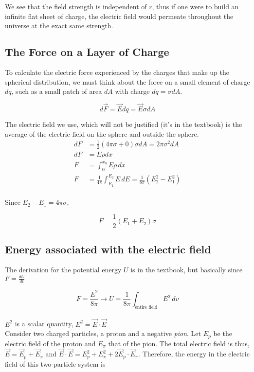 \documentclass[svgnames]{article}
\begin{document}
We see that the field strength is independent of $r$, thus if one were to build an infinite flat sheet of charge, the electric field would permeate throughout the universe at the exact same strength. 

\subsection{The Force on a Layer of Charge}

\vspace{20px}

To calculate the electric force experienced by the charges that make up the spherical distribution, we must think about the force on a small element of charge $dq$, such as a small patch of area $dA$ with charge $dq = \sigma dA$. 

\[ d\vec{F} = \vec{E} dq = \vec{E} \sigma dA \]

The electric field we use, which will not be justified (it's in the textbook) is the average of the electric field on the sphere and outside the sphere. \\ 
\begin{align*} 
 dF &= \frac{1}{2} (4\pi \sigma + 0)\sigma dA = 2\pi \sigma^2 dA\\
 dF &=  E \rho dx \\
 F &= \int_0^{x_0} E\rho \, dx \\
 F &= \frac{1}{4\pi} \int_{E_1}^{E_2} E \, dE = \frac{1}{8\pi} (E_2^2 - E_1^2)
 \end{align*} \\
 
 Since $E_2 - E_1 = 4\pi \sigma$, 
 
 \[ F = \frac{1}{2}(E_1 + E_2)\sigma \] 
 
 \subsection{Energy associated with the electric field} 
 
 The derivation for the potential energy $U$ is in the textbook, but basically since $F = \frac{dU}{dt}$
 
 \[ F = \frac{E^2}{8\pi} \rightarrow U = \frac{1}{8\pi} \int_\text{entire field} E^2 \, dv \] \\
 
 $E^2$ is a scalar quantity, $E^2 = \vec{E} \cdot \vec{E}$ \\
 
 Consider two charged particles, a proton and a negative \textit{pion}. Let $E_p$ be the electric field of the proton and $E_\pi$ that of the pion. The total electric field is thus, $\vec{E} = \vec{E}_p + \vec{E}_\pi$ and $\vec{E} \cdot \vec{E} = E_p^2 + E_\pi^2 + 2\vec{E}_p \cdot \vec{E}_\pi$. Therefore, the energy in the electric field of this two-particle system is 
 
\end{document}
